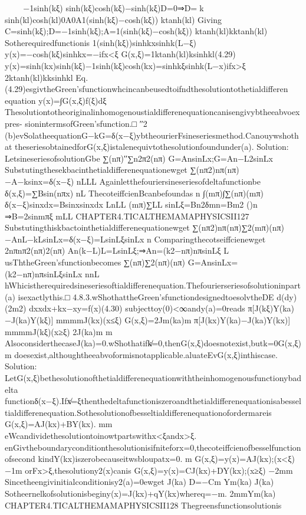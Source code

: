{{{{{{−1sinh(kξ)
sinh(kξ)cosh(kξ)−sinh(kξ)D=0⇒D=k
sinh(kl)cosh(kl)0A0A1(sinh(kξ)−cosh(kξ))
ktanh(kl)
Giving
C=sinh(kξ);D=−1sinh(kξ);A=1(sinh(kξ)−cosh(kξ))
ktanh(kl)kktanh(kl)
Sotherequiredfunctionis
{1(sinh(kξ))sinhkxsinhk(L−ξ)
y(x)=−cosh(kξ)sinhkx=−ifx<ξ
G(x,ξ)=1ktanh(kl)ksinhkl(4.29)
y(x)=sinh(kx)sinh(kξ)−1sinh(kξ)cosh(kx)=sinhkξsinhk(L−x)ifx>ξ
2ktanh(kl)kksinhkl
Eq.(4.29)esgivtheGreen’sfunctionwhcincanbeusedtoifndthesolutiontothetialdifferen
equation
y(x)=∫G(x,ξ)f(ξ)dξ
Thesolutiontotheoriginalinhomogenoustialdifferenequationcanisengivybtheeabvoexpres-
sionintermsofGreen’sfunction.□
′′2
(b)evSolatheequationG−kG=δ(x−ξ)ybtheourierFsineseriesmethod.Canouywshothat
theseriesobtainedforG(x,ξ)istalenequivtothesolutionfoundunder(a).
Solution:
LetsineseriesofsolutionGbe
∑(nπ)′′∑n2π2(nπ)
G=AnsinLx;G=An−L2sinLx
Substutingthesekbacinthetialdifferenequationewget
∑(nπ2)nπ(nπ)
−A−ksinx=δ(x−ξ)
nLLL
Againletthefouriersineseriesofdeltafunctionbe
δ(x,ξ)=∑Bsin(nπx)
nL
ThecoteiffcienBcanbefoundas
n
∫(mπ)∫∑(nπ)(mπ)
δ(x−ξ)sinxdx=Bsinxsinxdx
LnLL
(mπ)∑LL
sinLξ=Bn2δmn=Bm2
()n
⇒B=2sinmπξ
mLL
CHAPTER4.TICALTHEMAMAPHYSICSII127
Substutingthiskbactointhetialdifferenequationewget
∑(nπ2)nπ(nπ)∑2(mπ)(nπ)
−AnL−kLsinLx=δ(x−ξ)=LsinLξsinLx
n
Comparingthecotseiffcienewget
2nπnπ2(nπ)2(nπ)
An(k−L)L=LsinLξ;⇒An=(k2−nπ)nπsinLξ
L
usThtheGreen’sfunctionbecomes
∑(nπ)∑2(nπ)(nπ)
G=AnsinLx=(k2−nπ)nπsinLξsinLx
nnL
hWhicistherequiredsineseriesoftialdifferenequation.Thefourierseriesofsolutioninpart(a)
isexactlythis.□
4.8.3.wShothattheGreen’sfunctiondesignedtoesolvtheDE
d(dy)(2m2)
dxxdx+kx−xy=f(x)(4.30)
subjecttoy(0)<∞andy(a)=0reads
{π[J(kξ)Y(ka)−J(ka)Y(kξ)]
mmmmJ(kx)(x≤ξ)
G(x,ξ)=2Jm(ka)m
π[J(kx)Y(ka)−J(ka)Y(kx)]
mmmmJ(kξ)(x≥ξ)
2J(ka)m
m
AlsoconsiderthecaseJ(ka)=0.wShothatifk̸=0,thenG(x,ξ)doesnotexist,butk=0G(x,ξ)
m
doesexist,althoughtheeabvoformisnotapplicable.aluateEvG(x,ξ)inthiscase.
Solution:
LetG(x,ξ)bethesolutionofthetialdifferenequationwiththeinhomogenousfunctionybadelta
functionδ(x−ξ).Ifx̸=ξthenthedeltafunctioniszeroandthetialdifferenequationisabessel
tialdifferenequation.Sothesolutionofbesseltialdifferenequationofordermareis
G(x,ξ)=AJ(kx)+BY(kx).
mm
eWcandividethesolutiontoinowtpartswithx<ξandx>ξ.
enGivtheboundaryconditionthesolutionisifniteforx=0,thecoteiffcienofbesselfunctionofsecond
kindY(kx)iszerobecauseitwsbloupatx=0.
m
G(x,ξ)=y(x)=AJ(kx);(x<ξ)
−1m
orFx>ξ,thesolutiony2(x)canis
G(x,ξ)=y(x)=CJ(kx)+DY(kx);(x≥ξ)
−2mm
Sincetheengivinitialconditionisy2(a)=0ewget
J(ka)
D=−Cm
Ym(ka)
J(ka)
Sotheernelkofsolutionisbeginy(x)=J(kx)+qY(kx)whereq=−m.
2mmYm(ka)
CHAPTER4.TICALTHEMAMAPHYSICSII128
Thegreensfunctionsolutionis
}}}}}}}}
